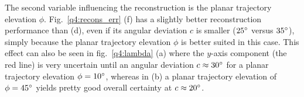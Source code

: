 \documentclass{report}
\begin{document}
The second variable influencing the reconstruction is the planar trajectory elevation $\phi$. Fig.~\ref{q4:recons_err} (f) has a slightly better reconstruction performance than (d), even if its angular deviation $c$ is smaller ($25\degree$ versus $35\degree$), simply because the planar trajectory elevation $\phi$ is better suited in this case. This effect can also be seen in fig.~\ref{q4:lambda} (a) where the $y$-axis component (the red line) is very uncertain until an angular deviation $c \approx 30\degree$ for a planar trajectory elevation $\phi = 10\degree$, whereas in (b) a planar trajectory elevation of $\phi = 45\degree$ yields pretty good overall certainty at $c \approx 20\degree$.

\end{document}
